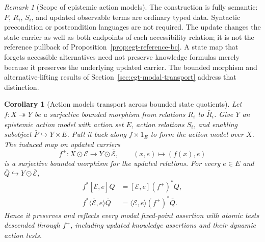 \documentclass[11pt,a4paper]{article}
\numberwithin{equation}{section}
\newtheorem{corollary}[theorem]{Corollary}
\theoremstyle{definition}
\theoremstyle{remark}
\newtheorem{remark}[theorem]{Remark}
\theoremstyle{plain}
\begin{document}
\begin{remark}[Scope of epistemic action models]
\label{rem:egt-action-scope}
The construction is fully semantic: $P$, $R_i$, $S_i$, and updated
observable terms are ordinary typed data. Syntactic precondition or
postcondition languages are not required. The update changes the
state carrier as well as both endpoints of each accessibility relation;
it is not the reference pullback of
Proposition~\ref{prop:egt-reference-bc}. A state map that forgets
accessible alternatives need not preserve knowledge formulas merely
because it preserves the underlying updated carrier. The bounded
morphism and alternative-lifting results of
Section~\ref{sec:egt-modal-transport} address that distinction.
\end{remark}

\begin{corollary}[Action models transport across bounded state quotients]
\label{cor:egt-action-bounded-quotient}
Let $f:X\twoheadrightarrow Y$ be a surjective bounded morphism from
relations $R_i$ to $\bar R_i$. Give $Y$ an epistemic action model with
action set $E$, action relations $S_i$, and enabling subobject
$\bar P\hookrightarrow Y\times E$. Pull it back along $f\times1_E$
to form the action model over $X$. The induced map on updated carriers
\[
 f^+:X\odot\mathcal E\longrightarrow Y\odot\bar{\mathcal E},
 \qquad(x,e)\longmapsto(f(x),e)
\]
is a surjective bounded morphism for the updated relations. For every
$e\in E$ and $\bar Q\hookrightarrow Y\odot\bar{\mathcal E}$,
\[
 \begin{aligned}
 f^*[\bar{\mathcal E},e]\bar Q
   &=[\mathcal E,e](f^+)^*\bar Q,\\
 f^*\langle\bar{\mathcal E},e\rangle\bar Q
   &=\langle\mathcal E,e\rangle(f^+)^*\bar Q.
 \end{aligned}
\]
Hence it preserves and reflects every modal fixed-point assertion with
atomic tests descended through $f^+$, including updated knowledge
assertions and their dynamic action tests.
\end{corollary}
\end{document}
